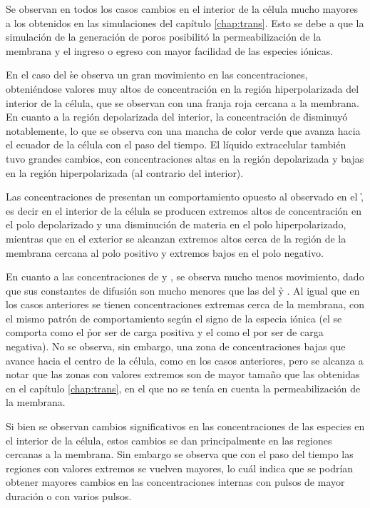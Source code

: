Se observan en todos los casos cambios en el interior de la célula mucho mayores a los obtenidos en las simulaciones del capítulo \ref{chap:trans}. Esto se debe a que la simulación de la generación de poros posibilitó la permeabilización de la membrana y el ingreso o egreso con mayor facilidad de las especies iónicas. 

En el caso del \h se observa un gran movimiento en las concentraciones, obteniéndose valores muy altos de concentración en la región hiperpolarizada del interior de la célula, que se observan con una franja roja cercana a la membrana. En cuanto a la región depolarizada del interior, la concentración de \h disminuyó notablemente, lo que se observa con una mancha de color verde que avanza hacia el ecuador de la célula con el paso del tiempo. El líquido extracelular también tuvo grandes cambios, con concentraciones altas en la región depolarizada y bajas en la región hiperpolarizada (al contrario del interior).

Las concentraciones de \oh presentan un comportamiento opuesto al observado en el \h, es decir en el interior de la célula se producen extremos altos de concentración en el polo depolarizado y una disminución de materia en el polo hiperpolarizado, mientras que en el exterior se alcanzan extremos altos cerca de la región de la membrana cercana al polo positivo y extremos bajos en el polo negativo. 

En cuanto a las concentraciones de \na y \cl, se observa mucho menos movimiento, dado que sus constantes de difusión son mucho menores que las del \h y \oh. Al igual que en los casos anteriores se tienen concentraciones extremas cerca de la membrana, con el mismo patrón de comportamiento según el signo de la especia iónica (el \na se comporta como el \h por ser de carga positiva y el \cl como el \oh por ser de carga negativa). No se observa, sin embargo, una zona de concentraciones bajas que avance hacia el centro de la célula, como en los casos anteriores, pero se alcanza a notar que las zonas con valores extremos son de mayor tamaño que las obtenidas en el capítulo \ref{chap:trans}, en el que no se tenía en cuenta la permeabilización de la membrana.

Si bien se observan cambios significativos en las concentraciones de las especies en el interior de la célula, estos cambios se dan principalmente en las regiones cercanas a la membrana. Sin embargo se observa que con el paso del tiempo las regiones con valores extremos se vuelven mayores, lo cuál indica que se podrían obtener mayores cambios en las concentraciones internas con pulsos de mayor duración o con varios pulsos. 

